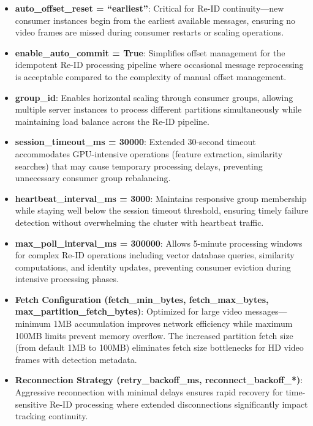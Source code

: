 \begin{itemize}
    \item \textbf{auto\_offset\_reset = ``earliest''}: Critical for Re-ID continuity—new consumer instances begin from the earliest available messages, ensuring no video frames are missed during consumer restarts or scaling operations.
    
    \item \textbf{enable\_auto\_commit = True}: Simplifies offset management for the idempotent Re-ID processing pipeline where occasional message reprocessing is acceptable compared to the complexity of manual offset management.
    
    \item \textbf{group\_id}: Enables horizontal scaling through consumer groups, allowing multiple server instances to process different partitions simultaneously while maintaining load balance across the Re-ID pipeline.
    
    \item \textbf{session\_timeout\_ms = 30000}: Extended 30-second timeout accommodates GPU-intensive operations (feature extraction, similarity searches) that may cause temporary processing delays, preventing unnecessary consumer group rebalancing.
    
    \item \textbf{heartbeat\_interval\_ms = 3000}: Maintains responsive group membership while staying well below the session timeout threshold, ensuring timely failure detection without overwhelming the cluster with heartbeat traffic.
    
    \item \textbf{max\_poll\_interval\_ms = 300000}: Allows 5-minute processing windows for complex Re-ID operations including vector database queries, similarity computations, and identity updates, preventing consumer eviction during intensive processing phases.
    
    \item \textbf{Fetch Configuration (fetch\_min\_bytes, fetch\_max\_bytes, max\_partition\_fetch\_bytes)}: Optimized for large video messages—minimum 1MB accumulation improves network efficiency while maximum 100MB limits prevent memory overflow. The increased partition fetch size (from default 1MB to 100MB) eliminates fetch size bottlenecks for HD video frames with detection metadata.
    
    \item \textbf{Reconnection Strategy (retry\_backoff\_ms, reconnect\_backoff\_*)}: Aggressive reconnection with minimal delays ensures rapid recovery for time-sensitive Re-ID processing where extended disconnections significantly impact tracking continuity.
\end{itemize}

